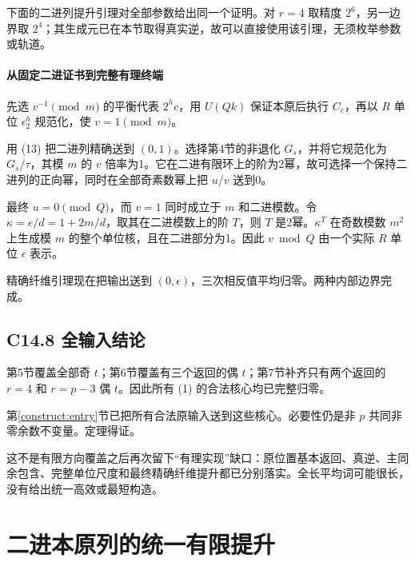 \documentclass[11pt,a4paper]{article}
\theoremstyle{definition}
\numberwithin{equation}{section}
\begin{document}
{下面的二进列提升引理对全部参数给出同一个证明。对} \(r=4\) {取精度} \(2^6\){，另一边界取} \(2^4\){；其生成元已在本节取得真实逆，故可以直接使用该引理，无须枚举参数或轨道。}

\paragraph*{\texorpdfstring{{从固定二进证书到完整有理终端}}{从固定二进证书到完整有理终端}}\label{C14-h105}

{先选} \(v^{-1}\pmod m\) {的平衡代表} \(2^h c\){，用} \(U(Qk)\) {保证本原后执行} \(C_c\){，再以} \(R\) {单位} \(\epsilon_2^h\) {规范化，使} \(v=1\pmod m\){。}

{用} {(13)} {把二进列精确送到} \((0,1)\){。选择第4节的非退化} \(G_s\){，并将它规范化为} \(G_s/\tau\){，其模} \(m\) {的} \(v\) {倍率为1。它在二进有限环上的阶为2幂，故可选择一个保持二进列的正向幂，同时在全部奇素数幂上把} \(u/v\) {送到0。}

{最终} \(u=0\pmod Q\){，而} \(v=1\) {同时成立于} \(m\) {和二进模数。令} \(\kappa=e/d=1+2m/d\){，取其在二进模数上的阶} \(T\){，则} \(T\) {是2幂。}\(\kappa^T\) {在奇数模数} \(m^2\) {上生成模} \(m\) {的整个单位核，且在二进部分为1。因此} \(v\bmod Q\) {由一个实际} \(R\) {单位} \(\epsilon\) {表示。}

{精确纤维引理现在把输出送到} \((0,\epsilon)\){，三次相反值平均归零。两种内部边界完成。}

\subsection*{\texorpdfstring{{C14.8} {全输入结论}}{C14.8 全输入结论}}\label{C14-h106}

{第5节覆盖全部奇} \(t\){；第6节覆盖有三个返回的偶} \(t\){；第7节补齐只有两个返回的} \(r=4\) {和} \(r=p-3\) {偶} \(t\){。因此所有} {(1)} {的合法核心均已完整归零。}

第\ref{construct:entry}节{已把所有合法原输入送到这些核心。必要性仍是非} \(p\) {共同非零余数不变量。定理得证。}

{这不是有限方向覆盖之后再次留下``有理实现''缺口：原位置基本返回、真逆、主同余包含、完整单位尺度和最终精确纤维提升都已分别落实。全长平均词可能很长，没有给出统一高效或最短构造。}


\section{二进本原列的统一有限提升}\label{construct:dyadic}
\end{document}
